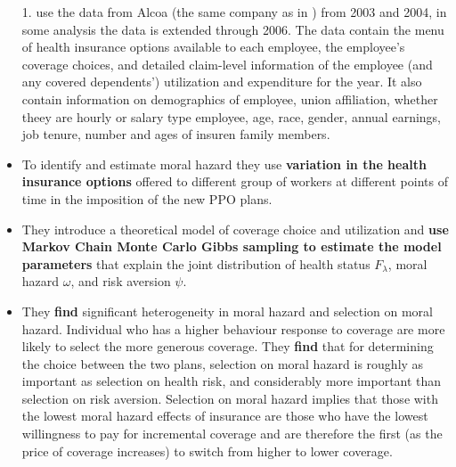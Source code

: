 \documentclass{article}
\newcommand{\bib}{references.bib}
\begin{document}
\begin{itemize}
    \item[1.] \textbf{\cite{einav2013selection}} use the data from Alcoa (the same company as in \cite{einav2010estimating}) from 2003 and 2004, in some analysis the data is extended through 2006. The data contain the menu of health insurance options available to each employee, the employee's coverage choices, and detailed claim-level information of the employee (and any covered dependents') utilization and expenditure for the year. It also contain information on demographics of employee, union affiliation, whether theey are hourly or salary type employee, age, race, gender, annual earnings, job tenure, number and ages of insuren family members. 
    \item To identify and estimate moral hazard they use \textbf{variation in the health insurance options} offered to different group of workers at different points of time in the imposition of the new PPO plans. 
    \item They introduce a theoretical model of coverage choice and utilization and \textbf{use Markov Chain Monte Carlo Gibbs sampling to estimate the model parameters} that explain the joint distribution of health status $F_\lambda$, moral hazard $\omega$, and risk aversion $\psi$. 
    \item They \textbf{find} significant heterogeneity in moral hazard and selection on moral hazard. Individual who has a higher behaviour response to coverage are more likely to select the more generous coverage. They \textbf{find} that for determining the choice between the two plans, selection on moral hazard is roughly as important as selection on health risk, and considerably more important than selection on risk aversion. Selection on moral hazard implies that those with the lowest moral hazard effects of insurance are those who have the lowest willingness to pay for incremental coverage and are therefore the first (as the price of coverage increases) to switch from higher to lower coverage.
\end{itemize}


\end{document}
